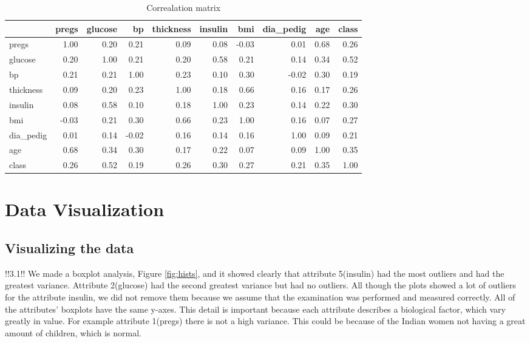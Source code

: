 \begin{table}
\caption{Correalation matrix}
\label{tab:cor}
\begin{tabular}{lrrrrrrrrr}
{} &  pregs &  glucose &    bp &  thickness &  insulin &   bmi &  dia\_pedig &   age &  class \\
\midrule
pregs     &   1.00 &     0.20 &  0.21 &       0.09 &     0.08 & -0.03 &       0.01 &  0.68 &   0.26 \\
glucose   &   0.20 &     1.00 &  0.21 &       0.20 &     0.58 &  0.21 &       0.14 &  0.34 &   0.52 \\
bp        &   0.21 &     0.21 &  1.00 &       0.23 &     0.10 &  0.30 &      -0.02 &  0.30 &   0.19 \\
thickness &   0.09 &     0.20 &  0.23 &       1.00 &     0.18 &  0.66 &       0.16 &  0.17 &   0.26 \\
insulin   &   0.08 &     0.58 &  0.10 &       0.18 &     1.00 &  0.23 &       0.14 &  0.22 &   0.30 \\
bmi       &  -0.03 &     0.21 &  0.30 &       0.66 &     0.23 &  1.00 &       0.16 &  0.07 &   0.27 \\
dia\_pedig &   0.01 &     0.14 & -0.02 &       0.16 &     0.14 &  0.16 &       1.00 &  0.09 &   0.21 \\
age       &   0.68 &     0.34 &  0.30 &       0.17 &     0.22 &  0.07 &       0.09 &  1.00 &   0.35 \\
class     &   0.26 &     0.52 &  0.19 &       0.26 &     0.30 &  0.27 &       0.21 &  0.35 &   1.00 \\
\bottomrule
\end{tabular}
\end{table}

\section{Data Visualization}

\subsection{Visualizing the data}
!!3.1!!
We made a boxplot analysis, Figure \ref{fig:hists}, and it showed clearly that attribute 5(insulin) had the most outliers
and had the greatest variance. Attribute 2(glucose) had the second greatest variance but had no outliers.
All though the plots showed a lot of outliers for the attribute insulin, we did not remove them because we
assume that the examination was performed and measured correctly.
All of the attributes' boxplots have the same y-axes. This detail is important because each attribute describes a
biological factor, which vary greatly in value.
For example attribute 1(pregs) there is not a high variance. This could be because of the Indian women not having
a great amount of children, which is normal.

